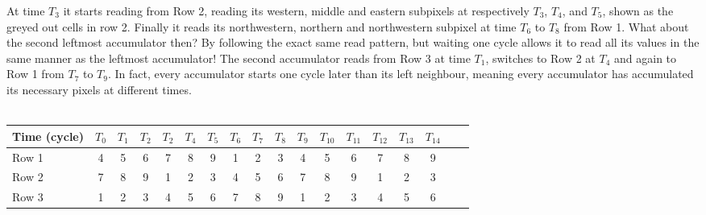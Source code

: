\begin{Description}
At time $T_{3}$ it starts reading from Row 2, reading its western, middle and eastern subpixels at respectively $T_{3}$, $T_{4}$, and $T_{5}$, shown as the greyed out cells in row 2.
Finally it reads its northwestern, northern and northwestern subpixel at time $T_{6}$ to $T_{8}$ from Row 1.
What about the second leftmost accumulator then? By following the exact same read pattern, but waiting one cycle allows it to read all its values in the same manner as the leftmost accumulator!
The second accumulator reads from Row 3 at time $T_{1}$, switches to Row 2 at $T_{4}$ and again to Row 1 from $T_{7}$ to $T_{9}$. 
In fact, every accumulator starts one cycle later than its left neighbour, meaning every accumulator has accumulated its necessary pixels at different times.
\\ \\
\begin{tabular}{l*{16}{c}r}
    Time (cycle)        & $T_{0}$ & $T_{1}$ & $T_{2}$ & $T_{2}$ & $T_{4}$  & $T_{5}$ & $T_{6}$ & $T_{7}$ & $T_{8}$ & $T_{9}$ & $T_{10}$ & $T_{11}$ & $T_{12}$ & $T_{13}$ & $T_{14}$\\
\hline
Row 1                   & \cellcolor{gray75} 4 & 5 & 6 & 7 & 8 & 9 & 1 & \cellcolor{gray75} 2 & \cellcolor{gray75} 3 & 4\cellcolor{gray75} & 5 & 6 & 7 & 8 & 9 & \\
Row 2                   & 7 & 8 & 9 & 1 & \cellcolor{gray75} 2 & \cellcolor{gray75} 3 & \cellcolor{gray75}4 & 5 & 6 & 7 & 8 & 9 & 1 & \cellcolor{gray75} 2 & \cellcolor{gray75} 3 & \\
Row 3                   & 1 & \cellcolor{gray75} 2 & \cellcolor{gray75} 3 & 4\cellcolor{gray75} & 5 & 6 & 7 & 8 & 9 & 1 & \cellcolor{gray75} 2 & \cellcolor{gray75} 3 & 4\cellcolor{gray75} & 5 & 6 & \\
\end{tabular}\\ \\ \\


\end{Description}
